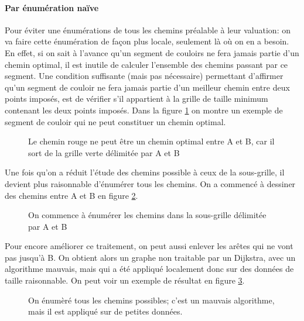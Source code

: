 \paragraph{Par énumération naïve}Pour éviter une énumérations de tous les chemins préalable à leur valuation: on va faire cette énumération de façon plus locale, seulement là où on en a besoin. En effet, si on sait à l'avance qu'un segment de couloirs ne fera jamais partie d'un chemin optimal, il est inutile de calculer l'ensemble des chemins passant par ce segment. Une condition suffisante (mais pas nécessaire) permettant d'affirmer qu'un segment de couloir ne fera jamais partie d'un meilleur chemin entre deux points imposés, est de vérifier s'il appartient à la grille de taille minimum contenant les deux points imposés. Dans la figure \ref{fig:grille2} on montre un exemple de segment de couloir qui ne peut constituer un chemin optimal.\\
\begin{figure}[h]
	\centering
	
	\caption{Le chemin rouge ne peut être un chemin optimal entre A et B, car il sort de la grille verte délimitée par A et B}
	\label{fig:grille2}
\end{figure}
Une fois qu'on a réduit l'étude des chemins possible à ceux de la sous-grille, il devient plus raisonnable d'énumérer tous les chemins. On a commencé à dessiner des chemins entre A et B en figure \ref{fig:grille3}.\\
\begin{figure}[h]
	\centering
	
	\caption{On commence à énumérer les chemins dans la sous-grille délimitée par A et B}
	\label{fig:grille3}
\end{figure}

Pour encore améliorer ce traitement, on peut aussi enlever les arêtes qui ne vont pas jusqu'à B. On obtient alors un graphe non traitable par un Dijkstra, avec un algorithme mauvais, mais qui a été appliqué localement donc sur des données de taille raisonnable. On peut voir un exemple de résultat en figure \ref{fig:grille4}.\\
\begin{figure}
	\centering
	
	\caption{On énumèré tous les chemins possibles; c'est un mauvais algorithme, mais il est appliqué sur de petites données.}
	\label{fig:grille4}
\end{figure}

